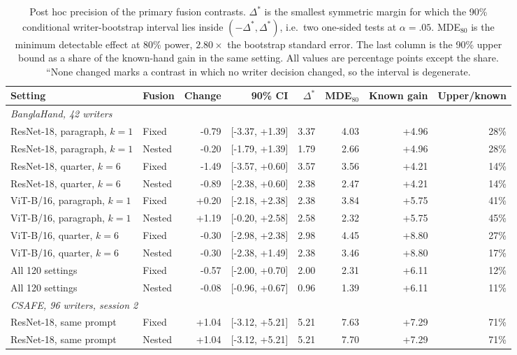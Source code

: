 \documentclass[10pt,a4paper]{article}
\begin{document}
\begin{table}[ht]
\caption{Post hoc precision of the primary fusion contrasts. $\Delta^*$ is the smallest symmetric margin for which the 90\% conditional writer-bootstrap interval lies inside $(-\Delta^*,\Delta^*)$, i.e.\ two one-sided tests at $\alpha=.05$. MDE$_{80}$ is the minimum detectable effect at 80\% power, $2.80\times$ the bootstrap standard error. The last column is the 90\% upper bound as a share of the known-hand gain in the same setting. All values are percentage points except the share. ``None changed marks a contrast in which no writer decision changed, so the interval is degenerate.}\label{tab:precision}
\centering\footnotesize\setlength{\tabcolsep}{3.5pt}
\begin{tabular}{llrrrrrr}\toprule
Setting & Fusion & Change & 90\% CI & $\Delta^*$ & MDE$_{80}$ & Known gain & Upper/known\\\midrule
\multicolumn{8}{l}{\emph{BanglaHand, 42 writers}}\\
ResNet-18, paragraph, $k=1$ & Fixed & -0.79 & [-3.37, +1.39] & 3.37 & 4.03 & +4.96 & 28\% \\
ResNet-18, paragraph, $k=1$ & Nested & -0.20 & [-1.79, +1.39] & 1.79 & 2.66 & +4.96 & 28\% \\
ResNet-18, quarter, $k=6$ & Fixed & -1.49 & [-3.57, +0.60] & 3.57 & 3.56 & +4.21 & 14\% \\
ResNet-18, quarter, $k=6$ & Nested & -0.89 & [-2.38, +0.60] & 2.38 & 2.47 & +4.21 & 14\% \\
ViT-B/16, paragraph, $k=1$ & Fixed & +0.20 & [-2.18, +2.38] & 2.38 & 3.84 & +5.75 & 41\% \\
ViT-B/16, paragraph, $k=1$ & Nested & +1.19 & [-0.20, +2.58] & 2.58 & 2.32 & +5.75 & 45\% \\
ViT-B/16, quarter, $k=6$ & Fixed & -0.30 & [-2.98, +2.38] & 2.98 & 4.45 & +8.80 & 27\% \\
ViT-B/16, quarter, $k=6$ & Nested & -0.30 & [-2.38, +1.49] & 2.38 & 3.46 & +8.80 & 17\% \\
All 120 settings & Fixed & -0.57 & [-2.00, +0.70] & 2.00 & 2.31 & +6.11 & 12\% \\
All 120 settings & Nested & -0.08 & [-0.96, +0.67] & 0.96 & 1.39 & +6.11 & 11\% \\
\midrule
\multicolumn{8}{l}{\emph{CSAFE, 96 writers, session 2}}\\
ResNet-18, same prompt & Fixed & +1.04 & [-3.12, +5.21] & 5.21 & 7.63 & +7.29 & 71\% \\
ResNet-18, same prompt & Nested & +1.04 & [-3.12, +5.21] & 5.21 & 7.70 & +7.29 & 71\% \\

\end{tabular}
\end{table}
\end{document}
